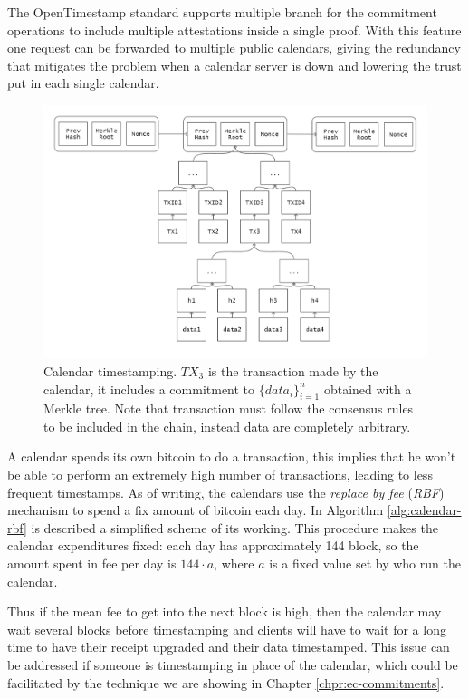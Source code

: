 The OpenTimestamp standard supports multiple branch for the commitment operations to include multiple attestations inside a single proof. With this feature one request can be forwarded to multiple public calendars, giving the redundancy that mitigates the problem when a calendar server is down and lowering the trust put in each single calendar.

\begin{figure}
	\begin{center}
		\includegraphics[width=\linewidth]{Images/bitcoin-chain-calendar.png}
		\caption[Calendar timestamping]{Calendar timestamping. $TX_3$ is the transaction made by the calendar, it includes a commitment to $\{data_i\}_{i=1}^n$ obtained with a Merkle tree. Note that transaction must follow the consensus rules to be included in the chain, instead data are completely arbitrary.}
		\label{fig:chain-calendar}
	\end{center}
\end{figure}

A calendar spends its own bitcoin to do a transaction, this implies that he won't be able to perform an extremely high number of transactions, leading to less frequent timestamps. As of writing, the calendars use the \textit{replace by fee} (\textit{RBF}) mechanism to spend a fix amount of bitcoin each day. In Algorithm \ref{alg:calendar-rbf} is described a simplified scheme of its working.
This procedure makes the calendar expenditures fixed: each day has approximately 144 block, so the amount spent in fee per day is $144 \cdot a$, where $a$ is a fixed value set by who run the calendar.

Thus if the mean fee to get into the next block is high, then the calendar may wait several blocks before timestamping and clients will have to wait for a long time to have their receipt upgraded and their data timestamped. This issue can be addressed if someone is timestamping in place of the calendar, which could be facilitated by the technique we are showing in Chapter \ref{chpr:ec-commitments}. 

